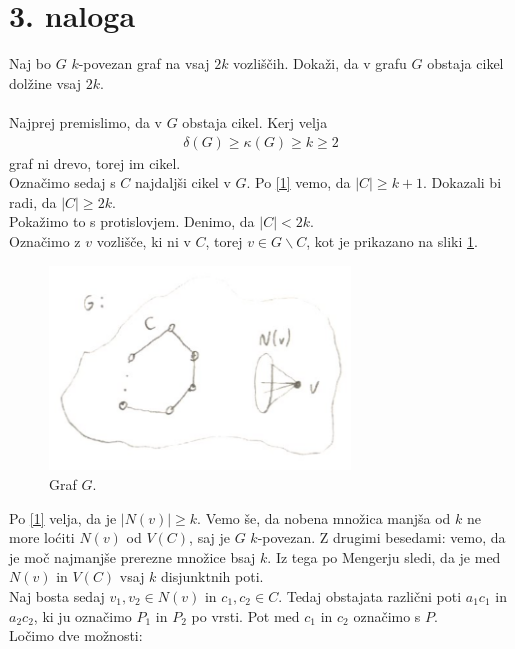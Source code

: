 \documentclass[a4paper,11pt]{article}
\begin{document}
\section*{3. naloga}
Naj bo $G$ $k$-povezan graf na vsaj $2k$ vozliščih. Dokaži, da v grafu $G$ obstaja cikel dolžine vsaj $2k$.
\\
\\
Najprej premislimo, da v $G$ obstaja cikel.
Kerj velja
\begin{align}\label{1}
    \delta (G) \geq \kappa (G) \geq k \geq 2
\end{align}
graf ni drevo, torej im cikel.
\\
Označimo sedaj s $C$ najdaljši cikel v $G$. Po \ref{1} vemo, da $|C| \geq k + 1$. Dokazali bi radi, da $|C| \geq 2k$. 
\\
Pokažimo to s protislovjem. Denimo, da $|C| < 2k$. 
\\
Označimo z $v$ vozlišče, ki ni v $C$, torej $v \in G \backslash C$, kot je prikazano na sliki \ref{graf}.
\begin{figure}[ht!]
    \centering
    \includegraphics[width=80mm]{3_graf.png}
    \caption{Graf $G$.}\label{graf}
\end{figure}
Po \ref{1} velja, da je $|N(v)| \geq k$. Vemo še, da nobena množica manjša od $k$ ne more loćiti $N(v)$ od $V(C)$, saj je $G$ $k$-povezan.
Z drugimi besedami: vemo, da je moč najmanjše prerezne množice bsaj $k$. Iz tega po Mengerju sledi, da je med $N(v)$ in $V(C)$ vsaj $k$ disjunktnih poti.
\\
Naj bosta sedaj $v_1, v_2 \in N(v)$ in $c_1, c_2 \in C$. Tedaj obstajata različni poti $a_1c_1$ in $a_2c_2$, ki ju označimo $P_1$ in $P_2$ po vrsti. Pot med $c_1$ in $c_2$ označimo s $P$.
\\
Ločimo dve možnosti:
\end{document}
